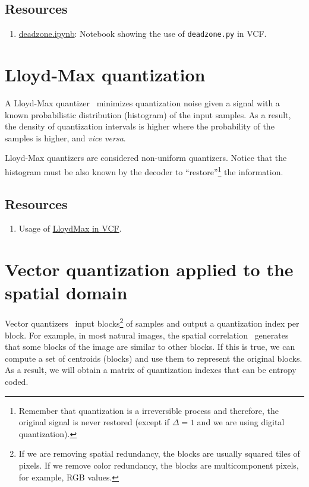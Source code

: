 \subsection*{Resources}

\begin{enumerate}
\item
  \href{https://github.com/Sistemas-Multimedia/VCF/blob/main/notebooks/deadzone.ipynb}{deadzone.ipynb}:
  Notebook showing the use of \texttt{deadzone.py} in VCF.
\end{enumerate}


\section{Lloyd-Max quantization}

A Lloyd-Max quantizer~\cite{vruiz__scalar_quantization} minimizes
quantization noise given a signal with a known probabilistic
distribution (histogram) of the input samples. As a result, the
density of quantization intervals is higher where the probability of
the samples is higher, and \textit{vice versa}.

Lloyd-Max quantizers are considered non-uniform quantizers. Notice
that the histogram must be also known by the decoder to
``restore''\footnote{Remember that quantization is a irreversible
  process and therefore, the original signal is never restored (except
  if $\Delta=1$ and we are using digital quantization).} the
information.

\subsection*{Resources}

\begin{enumerate}
\item Usage of \href{https://github.com/Sistemas-Multimedia/VCF/blob/main/notebooks/LloydMax.ipynb}{LloydMax in VCF}.
\end{enumerate}


\section{Vector quantization applied to the spatial domain}

Vector quantizers~\cite{vruiz__vector_quantization} input
blocks\footnote{If we are removing spatial redundancy, the blocks are
  usually squared tiles of pixels. If we remove color redundancy, the
  blocks are multicomponent pixels, for example, RGB values.} of
samples and output a quantization index per block. For example, in
most natural images, the spatial
correlation~\cite{vruiz__visual_redundancy} generates that some blocks
of the image are similar to other blocks. If this is true, we can
compute a set of centroids (blocks) and use them to represent the
original blocks. As a result, we will obtain a matrix of quantization
indexes that can be entropy coded.

